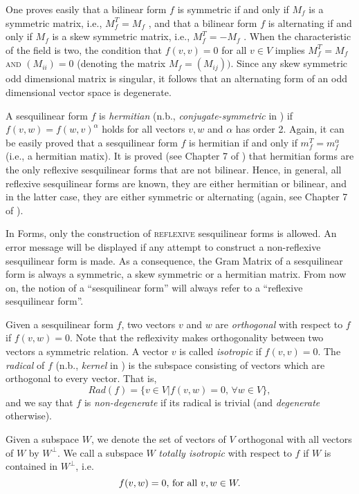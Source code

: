 \documentclass[a4paper,11pt]{report}
\begin{document}
{{ One proves easily that a bilinear form $f$ is symmetric if and only if $M_f$ is a symmetric matrix, i.e., $M_f^T=M_f$ , and that a bilinear form $f$ is alternating if and only if $M_f$ is a skew symmetric matrix, i.e., $M_f^T=-M_f$ . When the characteristic of the field is two, the condition that $f(v,v)=0$ for all $v \in V$ implies $M_f^T=M_f$  \textsc{and} $(M_{ii})=0$ (denoting the matrix $M_f = (M_{ij}))$. Since any skew symmetric odd dimensional matrix is singular, it follows that
an alternating form of an odd dimensional vector space is degenerate. 

 A sesquilinear form $f$ is \emph{hermitian} (n.b., \emph{conjugate-symmetric} in \cite{Atlas}) if $f(v,w)=f(w,v)^\alpha$  holds for all vectors $v,w$  and $\alpha$ has order 2. Again, it can be easily proved that a sesquilinear form $f$ is hermitian if and only if $m_f^T = m_f^{\alpha}$  (i.e., a hermitian matix). It is proved (see Chapter 7 of \cite{Taylor}) that hermitian forms are the only reflexive sesquilinear forms that are not
bilinear. Hence, in general, all reflexive sesquilinear forms are known, they
are either hermitian or bilinear, and in the latter case, they are either
symmetric or alternating (again, see Chapter 7 of \cite{Taylor}). 

 In \textsf{Forms}, only the construction of \textsc{reflexive} sesquilinear forms is allowed. An error message will be displayed if any
attempt to construct a non-reflexive sesquilinear form is made. As a
consequence, the Gram Matrix of a sesquilinear form is always a symmetric, a
skew symmetric or a hermitian matrix. From now on, the notion of a
``sesquilinear form'' will always refer to a ``reflexive sesquilinear form''. 

 Given a sesquilinear form $f$, two vectors $v$ and $w$ are \emph{orthogonal} with respect to $f$ if $f(v,w) = 0$. Note that the reflexivity makes orthogonality between two vectors a
symmetric relation. A vector $v$ is called \emph{isotropic} if $f(v,v)=0$. The \emph{radical} of $f$ (n.b., \emph{kernel} in \cite{Atlas}) is the subspace consisting of vectors which are orthogonal to every vector.
That is, 
\[Rad(f) = \{v \in V | f(v,w) = 0,\, \forall w \in V\},\]
 and we say that $f$ is \emph{non-degenerate} if its radical is trivial (and \emph{degenerate} otherwise). 

Given a subspace $W$, we denote the set of vectors of $V$ orthogonal with all vectors of $W$ by $W^\perp$. We call a subspace $W$ \emph{totally isotropic} with respect to $f$ if $W$ is contained in $W^\perp$, i.e. 
\[f(v,w) = 0,\, \mbox{\rm for all } v,w \in W.\]
 

}}
\end{document}
